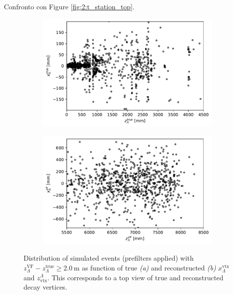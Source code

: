 Confronto con Figure \ref{fig:2:t_station_top}.

\begin{figure}[t]
	\centering
	\begin{subfigure}{.45\textwidth}
		\includegraphics[width=\textwidth]{graphics/04-event_selection/bump_Lambda_true_endvertex_z_vs_x.pdf}
		\caption{}
	\end{subfigure}
	\begin{subfigure}{.45\textwidth}
		\includegraphics[width=\textwidth]{graphics/04-event_selection/bump_scatter_Lambda_endvertex_z_vs_x.pdf}
		\caption{}
	\end{subfigure}
	\caption{Distribution of simulated \demonstratorshort events (prefilters applied) with $z_\Lambda^\text{VF} - z_\Lambda^\text{true} \geq \SI{2.0}{\meter}$ as function of true \textit{(a)} and reconstructed \textit{(b)} $x_\Lambda^\text{vtx}$ and $z_\text{vtx}^\Lambda$. This corresponds to a top view of true and reconstructed \lz decay vertices.}
\end{figure}


